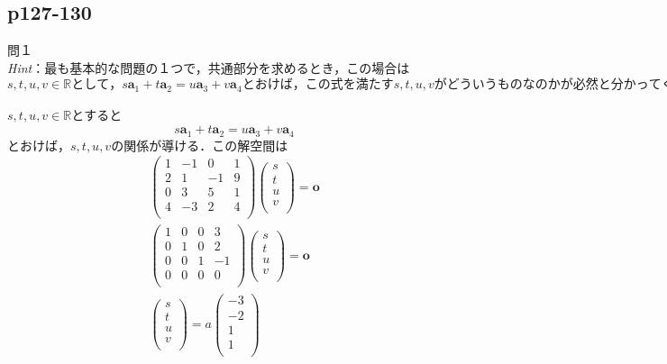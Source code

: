 \documentclass[dvipdfmx,uplatex,11pt]{jsarticle}
\begin{document}
\subsection{p127-130}
\noindent
問１
\noindent \\
\textsl{Hint}：最も基本的な問題の１つで，共通部分を求めるとき，この場合は$s,t,u,v \in \mathbb{R}として，s\bm{a}_1+t\bm{a}_2=u\bm{a}_3+v\bm{a}_4 とおけば，この式を満たすs,t,u,vがどういうものなのかが必然と分かってくる．なお，問題にされていないが和空間の基底を求める場合は，\bm{a}_1,\bm{a}_2,\bm{a}_3,\bm{a}_4から線型独立になるようなベクトルの組を求めればいい．$\\
\dotfill \\
$s,t,u,v \in \mathbb{R}とすると$
\begin{eqnarray*}
s\bm{a}_1+t\bm{a}_2=u\bm{a}_3+v\bm{a}_4
\end{eqnarray*}
$とおけば，s,t,u,vの関係が導ける．この解空間は$
\begin{eqnarray*}
\begin{pmatrix}
1 & -1 & 0 & 1 \\
2 & 1 & -1 & 9 \\
0 & 3 & 5 & 1 \\
4 & -3 & 2 & 4 \\
\end{pmatrix}
\begin{pmatrix}
s \\
t \\
u \\
v \\
\end{pmatrix}
=\bm{o} \\
\begin{pmatrix}
1 & 0 & 0 & 3 \\
0 & 1 & 0 & 2 \\
0 & 0 & 1 & -1 \\
0 & 0 & 0 & 0 \\
\end{pmatrix}
\begin{pmatrix}
s \\
t \\
u \\
v \\
\end{pmatrix}
=\bm{o} \\
\begin{pmatrix}
s \\
t \\
u \\
v \\
\end{pmatrix}
=a
\begin{pmatrix}
-3 \\
-2 \\
1 \\
1 \\
\end{pmatrix}
\end{eqnarray*}
\end{document}
